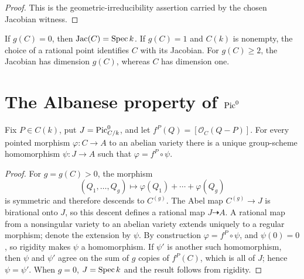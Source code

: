 \begin{proof}
  This is the geometric-irreducibility assertion carried by the chosen
  Jacobian witness.
\end{proof}

\begin{remark}
  If \(g(C)=0\), then \(\mathrm{Jac}(C)=\operatorname{Spec} k\).  If \(g(C)=1\) and \(C(k)\) is
  nonempty, the choice of a rational point identifies \(C\) with its
  Jacobian.  For \(g(C)\geq2\), the Jacobian has dimension \(g(C)\), whereas
  \(C\) has dimension one.
\end{remark}

\section{The Albanese property of \(\operatorname{Pic}^0\)}
\label{sec:Jacobian_routeA4_albaneseUP}

\begin{theorem}
  \label{thm:albanese_universal_property_northstar}
  Fix \(P\in C(k)\), put \(J=\operatorname{Pic}^0_{C/k}\), and let
  \(f^P(Q)=[\mathcal O_C(Q-P)]\).  For every pointed morphism
  \(\varphi\colon C\to A\) to an abelian variety there is a unique
  group-scheme homomorphism \(\psi\colon J\to A\) such that
  \(\varphi=f^P\circ\psi\).
\end{theorem}

\begin{proof}
  For \(g=g(C)>0\), the morphism
  \[
    (Q_1,\ldots,Q_g)\longmapsto
      \varphi(Q_1)+\cdots+\varphi(Q_g)
  \]
  is symmetric and therefore descends to \(C^{(g)}\).  The Abel map
  \(C^{(g)}\to J\) is birational onto \(J\), so this descent defines a
  rational map \(J\dashrightarrow A\).  A rational map from a nonsingular
  variety to an abelian variety extends uniquely to a regular morphism;
  denote the extension by \(\psi\).  By construction
  \(\varphi=f^P\circ\psi\), and \(\psi(0)=0\), so rigidity makes \(\psi\) a
  homomorphism.  If \(\psi'\) is another such homomorphism, then \(\psi\) and
  \(\psi'\) agree on the sum of \(g\) copies of \(f^P(C)\), which is all of
  \(J\); hence \(\psi=\psi'\).  When \(g=0\), \(J=\operatorname{Spec} k\) and the result
  follows from rigidity.
\end{proof}
